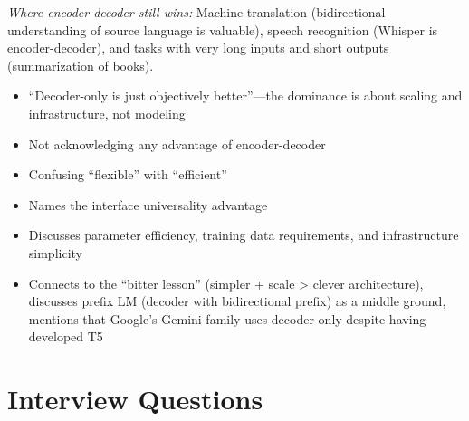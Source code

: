 \begin{interviewq}
\textit{Where encoder-decoder still wins:} Machine translation (bidirectional understanding of source language is valuable), speech recognition (Whisper is encoder-decoder), and tasks with very long inputs and short outputs (summarization of books).

\redflags
\begin{itemize}
    \item ``Decoder-only is just objectively better''---the dominance is about scaling and infrastructure, not modeling
    \item Not acknowledging any advantage of encoder-decoder
    \item Confusing ``flexible'' with ``efficient''
\end{itemize}


\goodgreat
\begin{itemize}
    \item {} Names the interface universality advantage
    \item {} Discusses parameter efficiency, training data requirements, and infrastructure simplicity
    \item {} Connects to the ``bitter lesson'' (simpler + scale > clever architecture), discusses prefix LM (decoder with bidirectional prefix) as a middle ground, mentions that Google's Gemini-family uses decoder-only despite having developed T5
\end{itemize}

\end{interviewq}

\section{Interview Questions}
\label{sec:nlp_interview}


